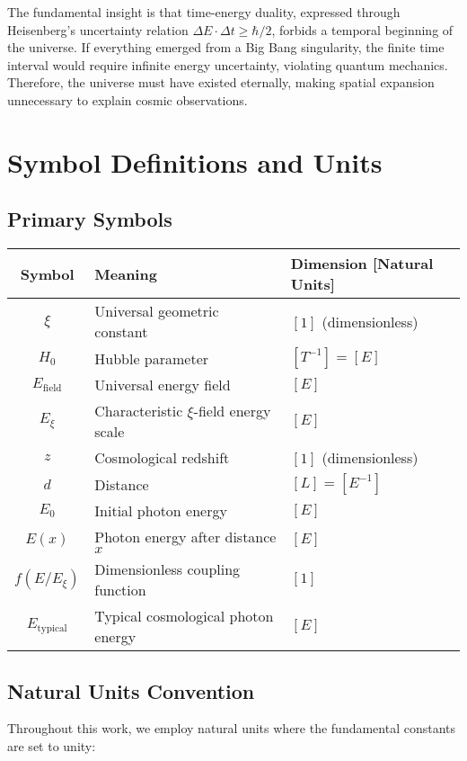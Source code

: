 \documentclass[12pt,a4paper]{article}
\begin{document}
	The fundamental insight is that time-energy duality, expressed through Heisenberg's uncertainty relation $\Delta E \cdot \Delta t \geq \hbar/2$, forbids a temporal beginning of the universe. If everything emerged from a Big Bang singularity, the finite time interval would require infinite energy uncertainty, violating quantum mechanics. Therefore, the universe must have existed eternally, making spatial expansion unnecessary to explain cosmic observations.
	
	\section{Symbol Definitions and Units}
	
	\subsection{Primary Symbols}
	
	\begin{longtable}{|c|l|l|}
		\hline
		\textbf{Symbol} & \textbf{Meaning} & \textbf{Dimension [Natural Units]} \\
		\hline
		$\xi$ & Universal geometric constant & $[1]$ (dimensionless) \\
		$H_0$ & Hubble parameter & $[T^{-1}] = [E]$ \\
		$E_{\text{field}}$ & Universal energy field & $[E]$ \\
		$E_\xi$ & Characteristic $\xi$-field energy scale & $[E]$ \\
		$z$ & Cosmological redshift & $[1]$ (dimensionless) \\
		$d$ & Distance & $[L] = [E^{-1}]$ \\
		$E_0$ & Initial photon energy & $[E]$ \\
		$E(x)$ & Photon energy after distance $x$ & $[E]$ \\
		$f(E/E_\xi)$ & Dimensionless coupling function & $[1]$ \\
		$E_{\text{typical}}$ & Typical cosmological photon energy & $[E]$ \\
		\hline
	\end{longtable}
	
	\subsection{Natural Units Convention}
	
	Throughout this work, we employ natural units where the fundamental constants are set to unity:
	
\end{document}

